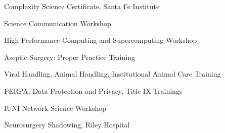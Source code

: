 
\begin{cventries}

  \cventry
    {} %
    {} %
    {} %
    {} %
    {
      \begin{cvitems} %
	\item{Complexity Science Certificate, Santa Fe Institute}
        \item {Science Communication Workshop }
	\item{High Performance Computing and Supercomputing Workshop }
	\item{Aseptic Surgery: Proper Practice Training}
	\item{Viral Handling, Animal Handling, Institutional Animal Care Training}
	\item{FERPA, Data Protection and Privacy, Title IX Trainings}
	\item{IUNI Network Science Workshop}
	\item{Neurosurgery Shadowing, Riley Hospital}
      \end{cvitems}
    }

\end{cventries}





